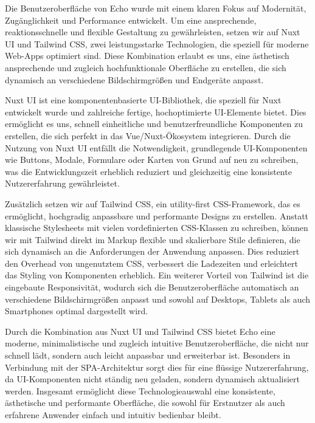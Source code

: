 \documentclass[a4paper,12pt]{article}
\begin{document}
Die Benutzeroberfläche von Echo wurde mit einem klaren Fokus auf Modernität,
Zugänglichkeit und Performance entwickelt. Um eine ansprechende,
reaktionsschnelle und flexible Gestaltung zu gewährleisten, setzen wir auf Nuxt
UI und Tailwind CSS, zwei leistungsstarke Technologien, die speziell für
moderne Web-Apps optimiert sind. Diese Kombination erlaubt es uns, eine
ästhetisch ansprechende und zugleich hochfunktionale Oberfläche zu erstellen,
die sich dynamisch an verschiedene Bildschirmgrößen und Endgeräte anpasst.

Nuxt UI ist eine komponentenbasierte UI-Bibliothek, die speziell für Nuxt
entwickelt wurde und zahlreiche fertige, hochoptimierte UI-Elemente bietet.
Dies ermöglicht es uns, schnell einheitliche und benutzerfreundliche
Komponenten zu erstellen, die sich perfekt in das Vue/Nuxt-Ökosystem
integrieren. Durch die Nutzung von Nuxt UI entfällt die Notwendigkeit,
grundlegende UI-Komponenten wie Buttons, Modale, Formulare oder Karten von
Grund auf neu zu schreiben, was die Entwicklungszeit erheblich reduziert und
gleichzeitig eine konsistente Nutzererfahrung gewährleistet.

Zusätzlich setzen wir auf Tailwind CSS, ein utility-first CSS-Framework, das es
ermöglicht, hochgradig anpassbare und performante Designs zu erstellen. Anstatt
klassische Stylesheets mit vielen vordefinierten CSS-Klassen zu schreiben,
können wir mit Tailwind direkt im Markup flexible und skalierbare Stile
definieren, die sich dynamisch an die Anforderungen der Anwendung anpassen.
Dies reduziert den Overhead von ungenutztem CSS, verbessert die Ladezeiten und
erleichtert das Styling von Komponenten erheblich. Ein weiterer Vorteil von
Tailwind ist die eingebaute Responsivität, wodurch sich die Benutzeroberfläche
automatisch an verschiedene Bildschirmgrößen anpasst und sowohl auf Desktops,
Tablets als auch Smartphones optimal dargestellt wird.

Durch die Kombination aus Nuxt UI und Tailwind CSS bietet Echo eine moderne,
minimalistische und zugleich intuitive Benutzeroberfläche, die nicht nur
schnell lädt, sondern auch leicht anpassbar und erweiterbar ist. Besonders in
Verbindung mit der SPA-Architektur sorgt dies für eine flüssige
Nutzererfahrung, da UI-Komponenten nicht ständig neu geladen, sondern dynamisch
aktualisiert werden. Insgesamt ermöglicht diese Technologieauswahl eine
konsistente, ästhetische und performante Oberfläche, die sowohl für Erstnutzer
als auch erfahrene Anwender einfach und intuitiv bedienbar bleibt.
\end{document}
